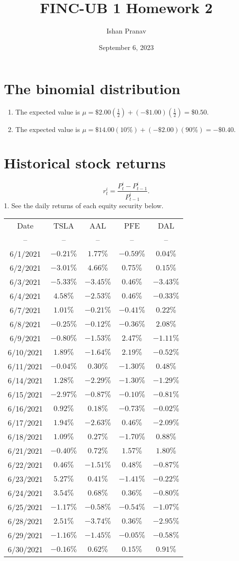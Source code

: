 \documentclass[12pt]{article}
\title{FINC-UB 1 Homework 2}
\author{Ishan Pranav}
\date{September 6, 2023}
\begin{document}
\maketitle
\section{The binomial distribution}
\begin{enumerate}
    \item The expected value is $\mu=\$2.00\left(\frac{1}{2}\right)+(-\$1.00)\left(\frac{1}{2}\right)=\$0.50$.
    \item The expected value is $\mu=\$14.00(10\%)+(-\$2.00)(90\%)=-\$0.40$.
\end{enumerate}
\section{Historical stock returns}
\[r_t^i=\frac{P_t^i-P_{t-1}^i}{P_{t-1}^i}.\]
1. See the daily returns of each equity security below.
\begin{center}
\begin{tabular}{c|c|c|c|c}
Date&TSLA&AAL&PFE&DAL\\
--&--&--&--&--\\
6/1/2021&$-0.21\%$&$1.77\%$&$-0.59\%$&$0.04\%$\\
6/2/2021&$-3.01\%$&$4.66\%$&$0.75\%$&$0.15\%$\\
6/3/2021&$-5.33\%$&$-3.45\%$&$0.46\%$&$-3.43\%$\\
6/4/2021&$4.58\%$&$-2.53\%$&$0.46\%$&$-0.33\%$\\
6/7/2021&$1.01\%$&$-0.21\%$&$-0.41\%$&$0.22\%$\\
6/8/2021&$-0.25\%$&$-0.12\%$&$-0.36\%$&$2.08\%$\\
6/9/2021&$-0.80\%$&$-1.53\%$&$2.47\%$&$-1.11\%$\\
6/10/2021&$1.89\%$&$-1.64\%$&$2.19\%$&$-0.52\%$\\
6/11/2021&$-0.04\%$&$0.30\%$&$-1.30\%$&$0.48\%$\\
6/14/2021&$1.28\%$&$-2.29\%$&$-1.30\%$&$-1.29\%$\\
6/15/2021&$-2.97\%$&$-0.87\%$&$-0.10\%$&$-0.81\%$\\
6/16/2021&$0.92\%$&$0.18\%$&$-0.73\%$&$-0.02\%$\\
6/17/2021&$1.94\%$&$-2.63\%$&$0.46\%$&$-2.09\%$\\
6/18/2021&$1.09\%$&$0.27\%$&$-1.70\%$&$0.88\%$\\
6/21/2021&$-0.40\%$&$0.72\%$&$1.57\%$&$1.80\%$\\
6/22/2021&$0.46\%$&$-1.51\%$&$0.48\%$&$-0.87\%$\\
6/23/2021&$5.27\%$&$0.41\%$&$-1.41\%$&$-0.22\%$\\
6/24/2021&$3.54\%$&$0.68\%$&$0.36\%$&$-0.80\%$\\
6/25/2021&$-1.17\%$&$-0.58\%$&$-0.54\%$&$-1.07\%$\\
6/28/2021&$2.51\%$&$-3.74\%$&$0.36\%$&$-2.95\%$\\
6/29/2021&$-1.16\%$&$-1.45\%$&$-0.05\%$&$-0.58\%$\\
6/30/2021&$-0.16\%$&$0.62\%$&$0.15\%$&$0.91\%$\\
\end{tabular}
\end{center}
\end{document}
